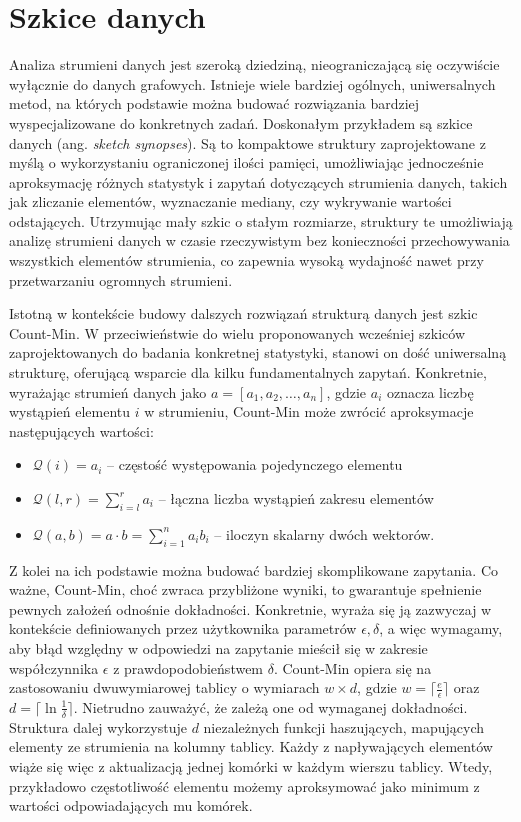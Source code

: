 \section{Szkice danych}
    Analiza strumieni danych jest szeroką dziedziną, nieograniczającą się oczywiście wyłącznie do danych grafowych. Istnieje wiele bardziej ogólnych, uniwersalnych metod, na których podstawie można budować rozwiązania bardziej wyspecjalizowane do konkretnych zadań. Doskonałym przykładem są szkice danych (ang. \textit{sketch synopses}). Są to kompaktowe struktury zaprojektowane z myślą o wykorzystaniu ograniczonej ilości pamięci, umożliwiając jednocześnie aproksymację różnych statystyk i zapytań dotyczących strumienia danych, takich jak zliczanie elementów, wyznaczanie mediany, czy wykrywanie wartości odstających. Utrzymując mały szkic o stałym rozmiarze, struktury te umożliwiają analizę strumieni danych w czasie rzeczywistym bez konieczności przechowywania wszystkich elementów strumienia, co zapewnia wysoką wydajność nawet przy przetwarzaniu ogromnych strumieni.
    
    Istotną w kontekście budowy dalszych rozwiązań strukturą danych jest szkic Count-Min\cite{Cormode_Muthukrishnan_2005}. W przeciwieństwie do wielu proponowanych wcześniej szkiców zaprojektowanych do badania konkretnej statystyki, stanowi on dość uniwersalną strukturę, oferującą wsparcie dla kilku fundamentalnych zapytań. Konkretnie, wyrażając strumień danych jako $a = [a_1, a_2, \dots, a_n]$, gdzie $a_i$ oznacza liczbę wystąpień elementu $i$ w strumieniu, Count-Min może zwrócić aproksymacje następujących wartości:
    \begin{itemize}
        \item $\mathcal{Q}(i) = a_i$ -- częstość występowania pojedynczego elementu 
        \item $\mathcal{Q}(l,r) = \sum\limits_{i = l}^{r} a_i$ -- łączna liczba wystąpień zakresu elementów 
        \item $\mathcal{Q}(a,b) = a \cdot b = \sum \limits_{i = 1}^{n} a_i b_i$ -- iloczyn skalarny dwóch wektorów.
    \end{itemize}
     Z kolei na ich podstawie można budować bardziej skomplikowane zapytania. Co ważne, Count-Min, choć zwraca przybliżone wyniki, to gwarantuje spełnienie pewnych założeń odnośnie dokładności. Konkretnie, wyraża się ją zazwyczaj w kontekście definiowanych przez użytkownika parametrów $\epsilon, \delta$, a więc wymagamy, aby błąd względny w odpowiedzi na zapytanie mieścił się w zakresie współczynnika $\epsilon$ z prawdopodobieństwem $\delta$. Count-Min opiera się na zastosowaniu dwuwymiarowej tablicy o wymiarach $w \times d$, gdzie $w = \lceil \frac{e}{\epsilon} \rceil$ oraz $d = \lceil \ln \frac{1}{\delta} \rceil$. Nietrudno zauważyć, że zależą one od wymaganej dokładności. Struktura dalej wykorzystuje $d$ niezależnych funkcji haszujących, mapujących elementy ze strumienia na kolumny tablicy. Każdy z napływających elementów wiąże się więc z aktualizacją jednej komórki w każdym wierszu tablicy. Wtedy, przykładowo częstotliwość elementu możemy aproksymować jako minimum z wartości odpowiadających mu komórek. 

